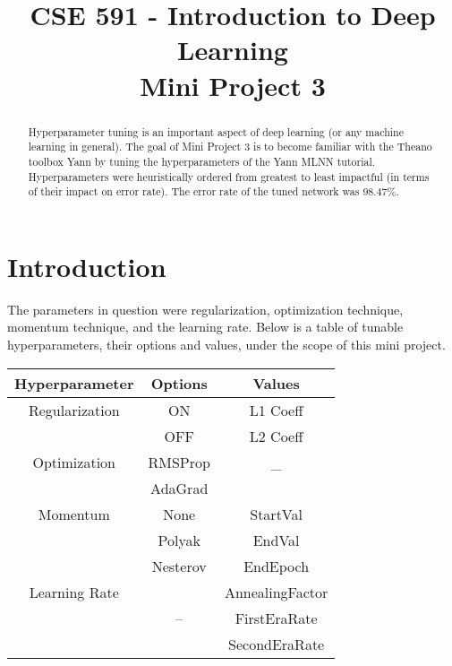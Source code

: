 \documentclass[conference,compsoc]{IEEEtran}
\begin{document}
%
\title{CSE 591 - Introduction to Deep Learning\\Mini Project 3}


\author{
}

\maketitle

\begin{abstract}
Hyperparameter tuning is an important aspect of deep learning (or any machine learning in general). The goal of Mini Project 3 is to become familiar with the Theano toolbox Yann by tuning the hyperparameters of the Yann MLNN tutorial. Hyperparameters were heuristically ordered from greatest to least impactful (in terms of their impact on error rate). The error rate of the tuned network was 98.47\%.
\end{abstract}



\IEEEpeerreviewmaketitle



\section{Introduction}
The parameters in question were regularization, optimization technique, momentum technique, and the learning rate. Below is a table of tunable hyperparameters, their options and values, under the scope of this mini project. 

\renewcommand{\arraystretch}{1.1}
\begin{center}
  \begin{tabular}{ | c | c  | c | }
    \hline
    \textbf{Hyperparameter} & \textbf{Options} & \textbf{Values} \\ \hline
    Regularization & ON & L1 Coeff \\  & OFF & L2 Coeff \\ \hline
    Optimization & RMSProp & \_ \\ & AdaGrad & \\ \hline
    Momentum &  None & StartVal \\ &  Polyak &  EndVal \\ & Nesterov &  EndEpoch \\ \hline
    Learning Rate &   & AnnealingFactor \\ & -- &  FirstEraRate \\ & &  SecondEraRate \\ \hline
  \end{tabular}
\end{center}
\end{document}
